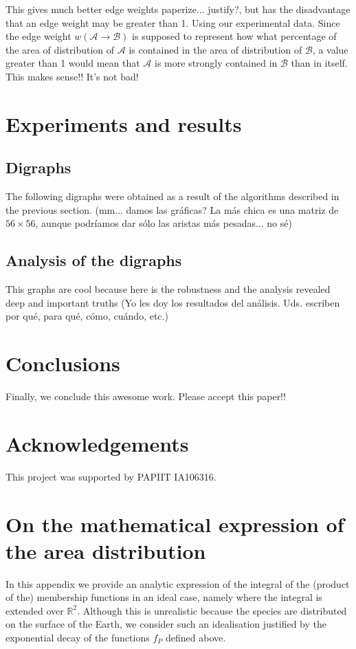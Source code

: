 \documentclass[12pt]{article}
\numberwithin{equation}{section} %
\numberwithin{figure}{section} %
\def\cA{{\mathcal{A}}}
\def\cB{{\mathcal{B}}}
\theoremstyle{definition}
\def\tcr#1{\textcolor{MyRed}{#1}}
\begin{document}
This gives much better edge weights \tcr{paperize... justify?}, but has the disadvantage that an edge weight may be greater than 1. Using our experimental data. Since the edge weight $w(\cA \to \cB)$ is supposed to represent how what percentage of the area of distribution of $\cA$ is contained in the area of distribution of $\cB$, a value greater than 1 would mean that $\cA$ is more strongly contained in $\cB$ than in itself. This makes sense!! It's not bad!

\section{Experiments and results}

\subsection{Digraphs}
The following digraphs were obtained as a result of the algorithms described in the previous section. \tcr{(mm... damos las gráficas? La más chica es una matriz de $56\times56$, aunque podríamos dar sólo las aristas más pesadas... no sé)}

\subsection{Analysis of the digraphs}
This graphs are cool because here is the robustness and the analysis revealed deep and important truths \tcr{(Yo les doy los resultados del análisis. Uds. escriben por qué, para qué, cómo, cuándo, etc.)}



\section{Conclusions}

Finally, we conclude this awesome work. Please accept this paper!!


\section*{Acknowledgements}

This project was supported by PAPIIT IA106316.






\appendix
\section{On the mathematical expression of the area distribution}
In this appendix we provide an analytic expression of the integral of the (product of the) membership functions in an ideal case, namely where the integral is extended over ${\mathbb R}^2$. Although this is unrealistic because the species are distributed on the surface of the Earth, we consider such an idealisation justified by the exponential decay of the functions $f_P$ defined above.
\end{document}

